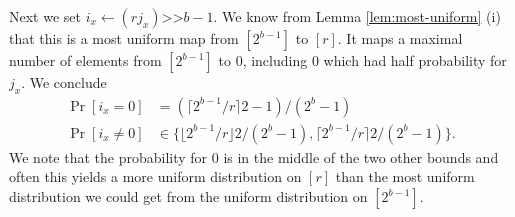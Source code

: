 \documentclass[12pt]{article}
\newcommand{\floor}[1]{\lfloor {#1} \rfloor}
\newcommand\ceil[1]{\lceil {#1}\rceil}
\begin{document}
Next we set $i_x\gets (rj_x)\texttt{>>}b-1$. We know from Lemma
\ref{lem:most-uniform} (i) that this is a most uniform map from
$[2^{b-1}]$ to $[r]$.  It maps a maximal number of elements from
$[2^{b-1}]$ to $0$, including $0$ which had half probability for
$j_x$.
We conclude
\begin{align}
   \Pr[i_x=0] &= (\ceil{2^{b-1}/r}2-1)/(2^{b}-1)
   \label{eq:prix0}
   \\
   \Pr[i_x\neq 0] &\in
   \{\floor{2^{b-1}/r}2/(2^{b}-1), \ceil{2^{b-1}/r}2/(2^{b}-1)\}
   \label{eq:prixneq0}
   .
\end{align}
We note
that the probability for $0$ is in the middle of the two other
bounds and often this yields a more uniform distribution on $[r]$ than
the most uniform distribution we could get from the
uniform distribution on $[2^{b-1}]$.
\end{document}

